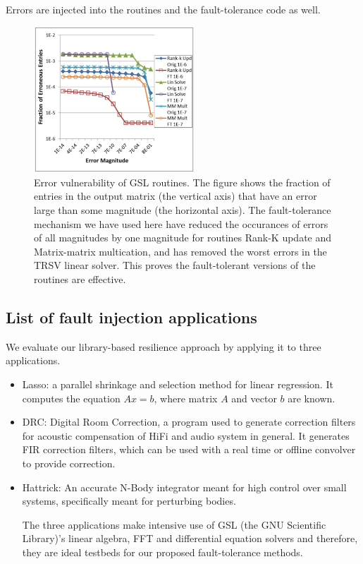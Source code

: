 \documentclass{article}
\begin{document}
Errors are injected into the routines and the fault-tolerance code as well.

\begin{figure}
\includegraphics[width=6cm]{vuln-gsl.png}
\caption{Error vulnerability of GSL routines. The figure shows the fraction of entries in the output matrix (the vertical axis) that have an error large than some magnitude (the horizontal axis). The fault-tolerance mechanism we have used here have reduced the occurances of errors of all magnitudes by one magnitude for routines Rank-K update and Matrix-matrix multication, and has removed the worst errors in the TRSV linear solver. This proves the fault-tolerant versions of the routines are effective.}
\label{vulnerabilityGSL}
\end{figure}

\subsection{List of fault injection applications}

We evaluate our library-based resilience approach by applying it to three applications.

\begin{itemize}
\item{Lasso: a parallel shrinkage and selection method for linear regression. It computes the equation $Ax=b$, where matrix $A$ and vector $b$ are known.}

\item{DRC: Digital Room Correction, a program used to generate correction filters for acoustic compensation of HiFi and audio system in general. It generates FIR correction filters, which can be used with a real time or offline convolver to provide correction.}

\item{Hattrick: An accurate N-Body integrator meant for high control over small systems, specifically meant for perturbing bodies.}

The three applications make intensive use of GSL (the GNU Scientific Library)'s linear algebra, FFT and differential equation solvers and therefore, they are ideal testbeds for our proposed fault-tolerance methods.

\end{itemize}
\end{document}
